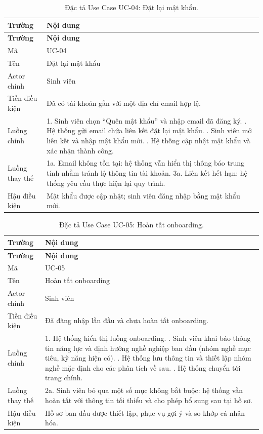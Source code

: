 \begin{longtable}{|L{3.5cm}|L{10cm}|}
\caption{Đặc tả Use Case UC-04: Đặt lại mật khẩu.}
\label{tab:uc04} \\
\hline
\textbf{Trường} & \textbf{Nội dung} \\
\hline
\endfirsthead
\hline
\textbf{Trường} & \textbf{Nội dung} \\
\hline
\endhead
Mã & UC-04 \\
\hline
Tên & Đặt lại mật khẩu \\
\hline
Actor chính & Sinh viên \\
\hline
Tiền điều kiện & Đã có tài khoản gắn với một địa chỉ email hợp lệ. \\
\hline
Luồng chính & 1. Sinh viên chọn ``Quên mật khẩu'' và nhập email đã đăng ký. . Hệ thống gửi email chứa liên kết đặt lại mật khẩu. . Sinh viên mở liên kết và nhập mật khẩu mới. . Hệ thống cập nhật mật khẩu và xác nhận thành công. \\
\hline
Luồng thay thế & 1a. Email không tồn tại: hệ thống vẫn hiển thị thông báo trung tính nhằm tránh lộ thông tin tài khoản. \newline 3a. Liên kết hết hạn: hệ thống yêu cầu thực hiện lại quy trình. \\
\hline
Hậu điều kiện & Mật khẩu được cập nhật; sinh viên đăng nhập bằng mật khẩu mới. \\
\hline
\end{longtable}

\begin{longtable}{|L{3.5cm}|L{10cm}|}
\caption{Đặc tả Use Case UC-05: Hoàn tất onboarding.}
\label{tab:uc05} \\
\hline
\textbf{Trường} & \textbf{Nội dung} \\
\hline
\endfirsthead
\hline
\textbf{Trường} & \textbf{Nội dung} \\
\hline
\endhead
Mã & UC-05 \\
\hline
Tên & Hoàn tất onboarding \\
\hline
Actor chính & Sinh viên \\
\hline
Tiền điều kiện & Đã đăng nhập lần đầu và chưa hoàn tất onboarding. \\
\hline
Luồng chính & 1. Hệ thống hiển thị luồng onboarding. . Sinh viên khai báo thông tin năng lực và định hướng nghề nghiệp ban đầu (nhóm nghề mục tiêu, kỹ năng hiện có). . Hệ thống lưu thông tin và thiết lập nhóm nghề mặc định cho các phân tích về sau. . Hệ thống chuyển tới trang chính. \\
\hline
Luồng thay thế & 2a. Sinh viên bỏ qua một số mục không bắt buộc: hệ thống vẫn hoàn tất với thông tin tối thiểu và cho phép bổ sung sau tại hồ sơ. \\
\hline
Hậu điều kiện & Hồ sơ ban đầu được thiết lập, phục vụ gợi ý và so khớp cá nhân hóa. \\
\hline
\end{longtable}

